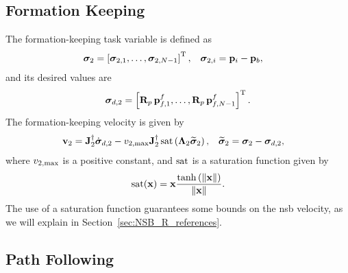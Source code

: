 \subsection{Formation Keeping}
\label{sec:NSB_R_formation}
The formation-keeping task variable is defined as
\begin{align}
    \bm{\sigma}_2 &= \left[\bm{\sigma}_{2,1}, \ldots, \bm{\sigma}_{2,N-1}\right]^{\mathrm{T}}, \label{eq:NSB_R_sigma_2} &
    \bm{\sigma}_{2,i} &= \mathbf{p}_i - \mathbf{p}_b,
\end{align}
and its desired values are 
\begin{equation}
    \bm{\sigma}_{d,2} = \left[\mathbf{R}_p\,\mathbf{p}_{f,1}^f, \ldots, \mathbf{R}_p\,\mathbf{p}_{f,N-1}^f\right]^{\mathrm{T}}  .
    \label{eq:NSB_R_sigma_d_2}
\end{equation}
The formation-keeping velocity is given by 
\begin{align}
    \mathbf{v}_2 &= \mathbf{J}_2^{\dagger}\dot{\bm{\sigma}}_{d,2} - v_{2, \max}\mathbf{J}_2^{\dagger}\,{\rm sat}\left(\bm{\Lambda}_2\widetilde{\bm{\sigma}}_2\right), &
    \widetilde{\bm{\sigma}}_2 &= \bm{\sigma}_2 - \bm{\sigma}_{d, 2},
    \label{eq:NSB_R_v_form}
\end{align}
where $v_{2, \max}$ is a positive constant, and $\rm sat$ is a saturation function given by 
\begin{equation}
    {\rm sat}(\mathbf{x}) = \mathbf{x} \frac{{\rm tanh}\left(\left\|\mathbf{x}\right\|\right)}{\left\|\mathbf{x}\right\|}.
\end{equation}
The use of a saturation function guarantees some bounds on the \gls{nsb} velocity, as we will explain in Section~\ref{sec:NSB_R_references}.

\subsection{Path Following}
\label{sec:NSB_R_LOS}

